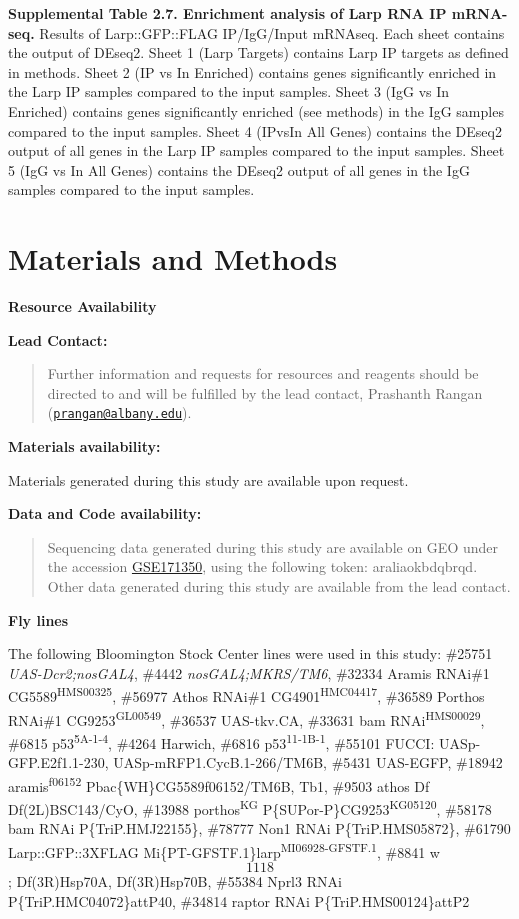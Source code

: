 \documentclass[12pt,oneside]{reedthesis}
\begin{document}
\textbf{\hfill\break
}

\textbf{Supplemental Table 2.7. Enrichment analysis of Larp RNA IP mRNA-seq.} Results of Larp::GFP::FLAG IP/IgG/Input mRNAseq. Each sheet contains the output of DEseq2. Sheet 1 (Larp Targets) contains Larp IP targets as defined in methods. Sheet 2 (IP vs In Enriched) contains genes significantly enriched in the Larp IP samples compared to the input samples. Sheet 3 (IgG vs In Enriched) contains genes significantly enriched (see methods) in the IgG samples compared to the input samples. Sheet 4 (IPvsIn All Genes) contains the DEseq2 output of all genes in the Larp IP samples compared to the input samples. Sheet 5 (IgG vs In All Genes) contains the DEseq2 output of all genes in the IgG samples compared to the input samples.

\hypertarget{materials-and-methods}{%
\section{Materials and Methods}\label{materials-and-methods}}

\textbf{Resource Availability}

\textbf{Lead Contact:}
\begin{quote}
Further information and requests for resources and reagents should be directed to and will be fulfilled by the lead contact, Prashanth Rangan (\href{mailto:prangan@albany.edu}{\nolinkurl{prangan@albany.edu}}).
\end{quote}
\textbf{Materials availability:}

Materials generated during this study are available upon request.

\textbf{Data and Code availability:}
\begin{quote}
Sequencing data generated during this study are available on GEO under the accession \href{https://www.ncbi.nlm.nih.gov/geo/query/acc.cgi?acc=GSE171350}{GSE171350}, using the following token: araliaokbdqbrqd. Other data generated during this study are available from the lead contact.
\end{quote}
\textbf{Fly lines}

The following Bloomington Stock Center lines were used in this study: \#25751 \emph{UAS-Dcr2;nosGAL4}, \#4442 \emph{nosGAL4;MKRS/TM6}, \#32334 Aramis RNAi\#1 CG5589\textsuperscript{HMS00325}, \#56977 Athos RNAi\#1 CG4901\textsuperscript{HMC04417}, \#36589 Porthos RNAi\#1 CG9253\textsuperscript{GL00549}, \#36537 UAS-tkv.CA, \#33631 bam RNAi\textsuperscript{HMS00029}, \#6815 p53\textsuperscript{5A-1-4}, \#4264 Harwich, \#6816 p53\textsuperscript{11-1B-1}, \#55101 FUCCI: UASp-GFP.E2f1.1-230, UASp-mRFP1.CycB.1-266/TM6B, \#5431 UAS-EGFP, \#18942 aramis\textsuperscript{f06152} Pbac\{WH\}CG5589f06152/TM6B, Tb1, \#9503 athos Df Df(2L)BSC143/CyO, \#13988 porthos\textsuperscript{KG} P\{SUPor-P\}CG9253\textsuperscript{KG05120}, \#58178 bam RNAi P\{TriP.HMJ22155\}, \#78777 Non1 RNAi P\{TriP.HMS05872\}, \#61790 Larp::GFP::3XFLAG Mi\{PT-GFSTF.1\}larp\textsuperscript{MI06928-GFSTF.1}, \#8841 w\[1118\]; Df(3R)Hsp70A, Df(3R)Hsp70B, \#55384 Nprl3 RNAi P\{TriP.HMC04072\}attP40, \#34814 raptor RNAi P\{TriP.HMS00124\}attP2
\end{document}

